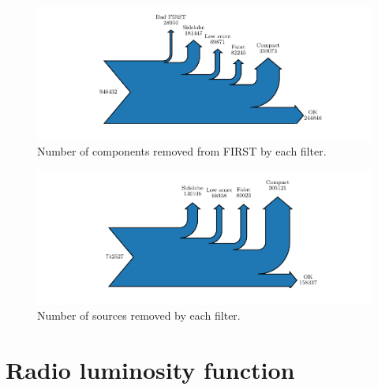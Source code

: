     \begin{figure}
        \centering
        \includegraphics{rlf-images/sankey_components.pdf}
        \caption{\label{fig:sankey-components} Number of components removed from FIRST by each filter.}
    \end{figure}

    \begin{figure}
        \centering
        \includegraphics{rlf-images/sankey_sources.pdf}
        \caption{\label{fig:sankey-sources} Number of sources removed by each filter.}
    \end{figure}

\section{Radio luminosity function}
\label{sec:rlfs-rlf-desc}

